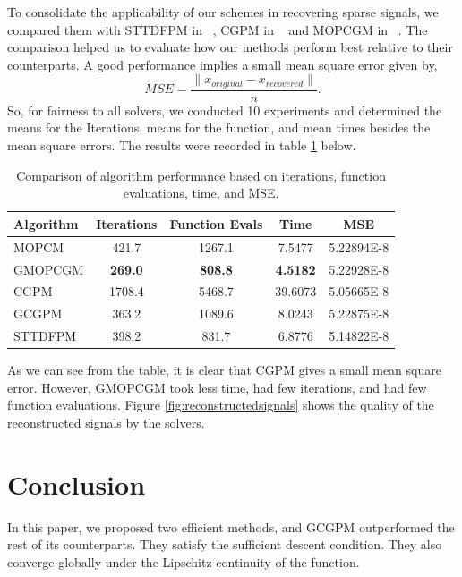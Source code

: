 \documentclass{article}
\theoremstyle{remark}
\begin{document}
{{{To consolidate the applicability of our schemes in recovering sparse signals, we compared them with STTDFPM in ~\cite{ibrahim2023two}, CGPM in ~\cite{zheng2020conjugate} and MOPCGM in ~\cite{sabi2023modified}. The comparison helped us to evaluate how our methods perform best relative to their counterparts. A good performance implies a small mean square error given by,
\[
MSE=\frac{\|x_{original}-x_{recovered}\|}{n}.
\]
So, for fairness to all solvers, we conducted 10 experiments and determined the means for the  Iterations, means for the function, and mean times besides the mean square errors. The results were recorded in table \ref{tab:algorithm_performance} below.
{\small 
\begin{table}[H]
    \centering
    \begin{tabular}{lcccc}
        \toprule
        \textbf{Algorithm} & \textbf{Iterations} & \textbf{Function Evals } & \textbf{Time} & \textbf{MSE} \\
        \midrule
        MOPCM        & 421.7           & 1267.1 & 7.5477 & \num{5.22894E-8} \\
        GMOPCGM      & \textbf{269.0}  & \textbf{808.8}  & \textbf{4.5182} & \num{5.22928E-8} \\
        CGPM         & 1708.4          & 5468.7 & 39.6073 & \num{5.05665E-8} \\
        GCGPM        & 363.2           & 1089.6 & 8.0243 & \num{5.22875E-8} \\
        STTDFPM      & 398.2           & 831.7  & 6.8776 & \num{5.14822E-8} \\
        \bottomrule
    \end{tabular}
    \caption{Comparison of algorithm performance based on iterations, function evaluations, time, and MSE.}
    \label{tab:algorithm_performance}
\end{table}
}
As we can see from the table, it is clear that CGPM gives a small mean square error. However, GMOPCGM took less time, had few iterations, and had few function evaluations. Figure \ref{fig:reconstructedsignals} shows the quality of the reconstructed signals by the solvers.


}
\section*{Conclusion}
In this paper, we proposed two efficient methods, and GCGPM outperformed the rest of its counterparts. They satisfy the sufficient descent condition. They also converge globally under the Lipschitz continuity of the function.

}}
\end{document}
